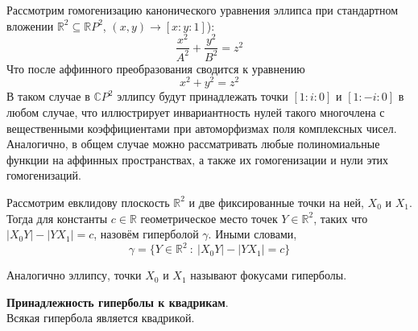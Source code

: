 \documentclass[11pt]{article}
\begin{document}
    \vspace{10pt}

    Рассмотрим гомогенизацию канонического уравнения эллипса при стандартном вложении $\mathbb{R}^2 \subseteq \mathbb{R}P^2$, $(x, y) \to [x:y:1]$):
    \begin{equation*}
        \dfrac{x^2}{A^2} + \dfrac{y^2}{B^2} = z^2
    \end{equation*}
    Что после аффинного преобразования сводится к уравнению
    \begin{equation*}
        x^2 + y^2 = z^2
    \end{equation*}
    В таком случае в $\mathbb{C}P^2$ эллипсу будут принадлежать точки $[1:i:0]$ и $[1:-i:0]$ в любом случае, что иллюстрирует инвариантность нулей такого многочлена с вещественными коэффициентами при автоморфизмах поля комплексных чисел. \\
    Аналогично, в общем случае можно рассматривать любые полиномиальные функции на аффинных пространствах, а также их гомогенизации и нули этих гомогенизаций.

    \begin{definition}
    Рассмотрим евклидову плоскость $\mathbb{R}^2$ и две фиксированные точки на ней, $X_0$ и $X_1$. Тогда для константы $c \in \mathbb{R}$ геометрическое место точек $Y \in \mathbb{R}^2$, таких что $|X_0Y| - |YX_1| = c$, назовём гиперболой $\gamma$. Иными словами,
    \begin{equation*}
        \gamma = \{Y \in \mathbb{R}^2 \ :\ |X_0Y| - |YX_1| = c\}
    \end{equation*}
    \end{definition}

    \begin{remark}
    Аналогично эллипсу, точки $X_0$ и $X_1$ называют фокусами гиперболы.
    \end{remark}

    \begin{lemma}
    \textbf{Принадлежность гиперболы к квадрикам}.\\ Всякая гипербола является квадрикой.
    \end{lemma}
\end{document}
